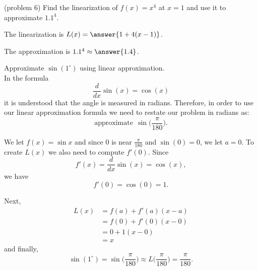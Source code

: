 \documentclass[handout]{ximera}
\begin{document}
\begin{problem}(problem 6)
Find the linearization of $f(x) = x^4$ at $x = 1$ and use it to approximate $1.1^4$.

The linearization is  $L(x) = \answer{1 + 4 (x-1)}$.

The approximation is $1.1^4 \approx \answer{1.4}$.
\end{problem}

\begin{example}[example 7]
Approximate $\sin(1^{\circ})$ using linear approximation.\\
In the formula 
\[ \frac{d}{dx} \sin(x) = \cos(x) \]
it is understood that the angle is measured in radians. Therefore, in order to use our linear approximation 
formula we need to restate our problem in radians as:  
\[\text{approximate} \ \ \sin\big(\frac{\pi}{180}\big).\]

We let $f(x) = \sin x$ and since 0 is near $\frac{\pi}{180}$ and $\sin(0) = 0$, we let 
$a = 0$. To create $L(x)$ we also need to compute $f'(0)$. 
Since 
\[f'(x) = \frac{d}{dx} \sin(x) = \cos(x),\] 
we have
\[f'(0) = \cos(0) = 1.\]

Next, 
\begin{align*}
L(x) &= f(a) + f'(a)(x - a) \\
&= f(0) + f'(0)(x - 0) \\
&= 0 + 1(x - 0)\\
&= x
\end{align*}
and finally,
\[\sin(1^{\circ}) = \sin\big(\frac{\pi}{180}\big) \approx L\big(\frac{\pi}{180}\big) = \frac{\pi}{180}.\]
\end{example}


 

\begin{center}
\begin{foldable}
\end{foldable}
\end{center}
\end{document}
